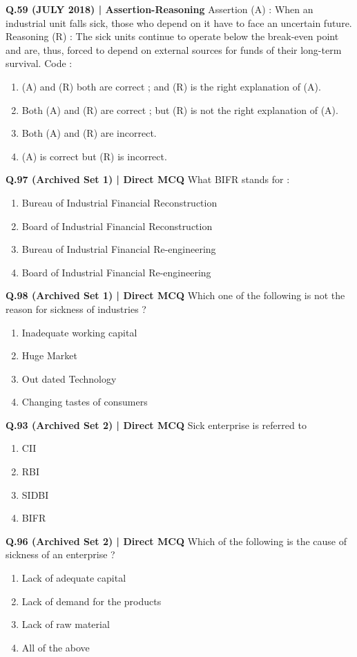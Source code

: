 \documentclass{article}
\begin{document}
\textbf{Q.59 (JULY 2018) | Assertion-Reasoning}
Assertion (A) : When an industrial unit falls sick, those who depend on it have to face an uncertain future.
Reasoning (R) : The sick units continue to operate below the break-even point and are, thus, forced to depend on external sources for funds of their long-term survival.
Code :
\begin{enumerate}[label=(\arabic*)]
    \item (A) and (R) both are correct ; and (R) is the right explanation of (A).
    \item Both (A) and (R) are correct ; but (R) is not the right explanation of (A).
    \item Both (A) and (R) are incorrect.
    \item (A) is correct but (R) is incorrect.
\end{enumerate}

\textbf{Q.97 (Archived Set 1) | Direct MCQ}
What BIFR stands for :
\begin{enumerate}[label=(\arabic*)]
    \item Bureau of Industrial Financial Reconstruction
    \item Board of Industrial Financial Reconstruction
    \item Bureau of Industrial Financial Re-engineering
    \item Board of Industrial Financial Re-engineering
\end{enumerate}

\textbf{Q.98 (Archived Set 1) | Direct MCQ}
Which one of the following is not the reason for sickness of industries ?
\begin{enumerate}[label=(\arabic*)]
    \item Inadequate working capital
    \item Huge Market
    \item Out dated Technology
    \item Changing tastes of consumers
\end{enumerate}

\textbf{Q.93 (Archived Set 2) | Direct MCQ}
Sick enterprise is referred to
\begin{enumerate}[label=(\arabic*)]
    \item CII
    \item RBI
    \item SIDBI
    \item BIFR
\end{enumerate}

\textbf{Q.96 (Archived Set 2) | Direct MCQ}
Which of the following is the cause of sickness of an enterprise ?
\begin{enumerate}[label=(\arabic*)]
    \item Lack of adequate capital
    \item Lack of demand for the products
    \item Lack of raw material
    \item All of the above
\end{enumerate}
\end{document}

